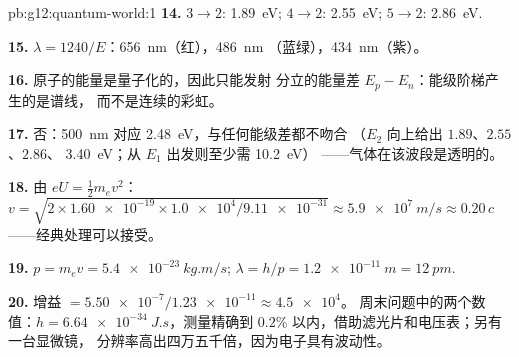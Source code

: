 \begin{solution}{pb:g12:quantum-world:1}
\textbf{14.} $3 \to 2$: \qty{1.89}{eV}; $4 \to 2$: \qty{2.55}{eV};
$5 \to 2$: \qty{2.86}{eV}.

\textbf{15.} $\lambda = 1240/E$：\qty{656}{nm}（红），\qty{486}{nm}
（蓝绿），\qty{434}{nm}（紫）。

\textbf{16.} 原子的能量是量子化的，因此只能发射
分立的能量差 $E_p - E_n$：能级阶梯产生的是谱线，
而不是连续的彩虹。

\textbf{17.} 否：\qty{500}{nm} 对应 \qty{2.48}{eV}，与任何能级差都不吻合
（$E_2$ 向上给出 $1.89$、$2.55$、$2.86$、
\qty{3.40}{eV}；从 $E_1$ 出发则至少需 \qty{10.2}{eV}）
——气体在该波段是透明的。

\textbf{18.} 由 $eU = \tfrac12 m_e v^2$：$v = \sqrt{2 \times
\num{1.60e-19} \times \num{1.0e4}/\num{9.11e-31}} \approx
\qty{5.9e7}{m/s} \approx 0.20\,c$——经典处理可以接受。

\textbf{19.} $p = m_e v = \qty{5.4e-23}{kg.m/s}$;
$\lambda = h/p = \qty{1.2e-11}{m} = \qty{12}{pm}$.

\textbf{20.} 增益 $= \num{5.50e-7}/\num{1.23e-11} \approx \num{4.5e4}$。
周末问题中的两个数值：$h = \qty{6.64e-34}{J.s}$，测量精确到
$0.2\%$ 以内，借助滤光片和电压表；另有一台显微镜，
分辨率高出四万五千倍，因为电子具有波动性。
\end{solution}
